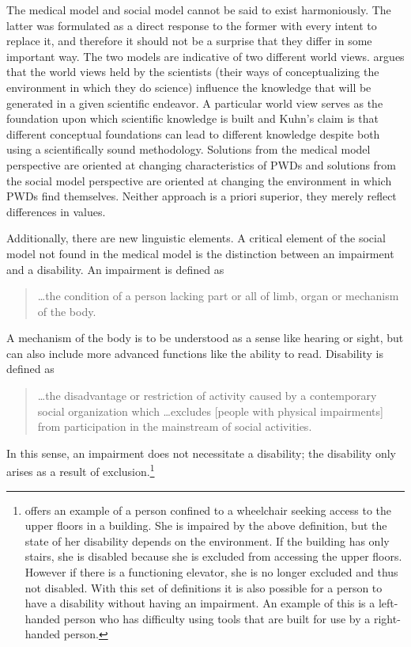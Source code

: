 \documentclass[a4paper]{article}
\begin{document}
The medical model and social model cannot be said to exist harmoniously. The
latter was formulated as a direct response to the former with every intent to
replace it, and therefore it should not be a surprise that they differ in some
important way. The two models are indicative of two different world views.
\cite{kuhn1970structure} argues that the world views held by the scientists
(their ways of conceptualizing the environment in which they do science)
influence the knowledge that will be generated in a given scientific endeavor.
A particular world view serves as the foundation upon which scientific
knowledge is built and Kuhn's claim is that different conceptual foundations
can lead to different knowledge despite both using a scientifically sound
methodology. Solutions from the medical model perspective are oriented at
changing characteristics of PWDs and solutions from the social model
perspective are oriented at changing the environment in which PWDs find
themselves. Neither approach is a priori superior, they merely reflect
differences in values.

Additionally, there are new linguistic elements. A critical element of the
social model not found in the medical model is the distinction between an
impairment and a disability. An impairment is defined as 
%
\begin{quote}
    \ldots the condition of a person lacking part or all of limb, organ or mechanism
    of the body.
\end{quote}
%
A mechanism of the body is to be understood as a sense like hearing or sight,
but can also include more advanced functions like the ability to read.
Disability is defined as 
%
\begin{quote}
    \ldots the disadvantage or restriction of activity caused by a contemporary
    social organization which \ldots excludes [people with physical
    impairments] from participation in the mainstream of social activities.
\end{quote}
%
In this sense, an impairment does not necessitate a disability; the disability
only arises as a result of exclusion.\footnote{\cite{winter2003development}
offers an example of a person confined to a wheelchair seeking access to the
upper floors in a building. She is impaired by the above definition, but the
state of her disability depends on the environment. If the building has only
stairs, she is disabled because she is excluded from accessing the upper
floors. However if there is a functioning elevator, she is no longer excluded
and thus not disabled. With this set of definitions it is also possible for a
person to have a disability without having an impairment. An example of this
is a left-handed person who has difficulty using tools that are built for use
by a right-handed person.}
\end{document}
